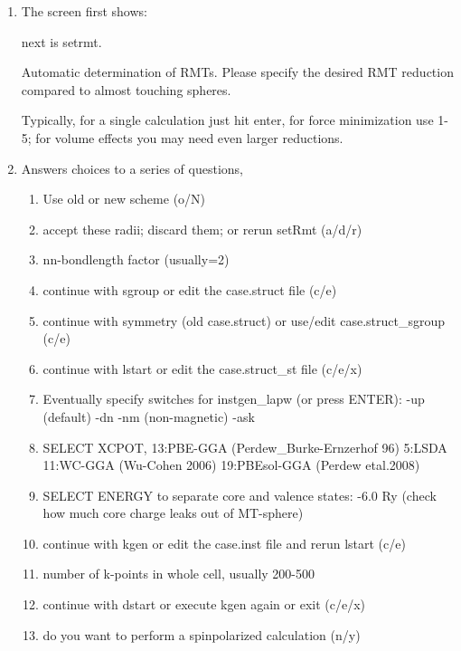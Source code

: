 \documentclass[12 pt]{article}
\begin{document}
  \begin{enumerate}

   \item The screen first shows:

  next is setrmt. 

  Automatic determination of RMTs. Please specify the desired RMT reduction compared to almost touching spheres.

  Typically, for a single calculation just hit enter, for force minimization use 1-5; for volume effects you may 
need even larger reductions. 

   \item Answers choices to a series of questions,

    \begin{enumerate}

  \item Use old or new scheme (o/N)

  \item accept these radii; discard them; or rerun setRmt (a/d/r) 

  \item nn-bondlength factor (usually=2)

  \item continue with sgroup or edit the case.struct file (c/e) 

  \item continue with symmetry (old case.struct) or use/edit case.struct\_sgroup (c/e) 

  \item continue with lstart or edit the case.struct\_st file (c/e/x)

  \item Eventually specify switches for instgen\_lapw (or press ENTER): -up (default) -dn -nm (non-magnetic) -ask 

  \item SELECT XCPOT, 13:PBE-GGA (Perdew\_Burke-Ernzerhof 96) 5:LSDA 11:WC-GGA (Wu-Cohen 2006) 19:PBEsol-GGA 
(Perdew etal.2008)

  \item SELECT ENERGY to separate core and valence states: -6.0 Ry (check how much core charge leaks out of
 MT-sphere)

  \item continue with kgen or edit the case.inst file and rerun lstart (c/e)

  \item number of k-points in whole cell, usually 200-500 

  \item continue with dstart or execute kgen again or exit (c/e/x)

  \item do you want to perform a spinpolarized calculation (n/y)

    \end{enumerate}
     
  \end{enumerate}
\end{document}
